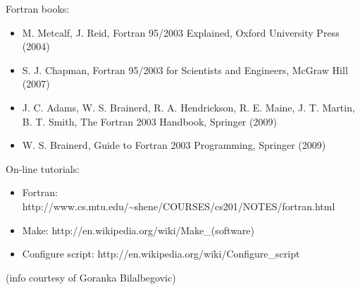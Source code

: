 \documentclass[12pt,a4paper]{article}
\begin{document}
Fortran books:
\begin{itemize}
\item
M. Metcalf, J. Reid, Fortran 95/2003 Explained, Oxford University Press (2004)
\item
S. J. Chapman, Fortran 95/2003 for Scientists and Engineers, McGraw Hill (2007)
\item
J. C. Adams, W. S. Brainerd, R. A. Hendrickson, R. E. Maine, J. T. Martin,
B. T. Smith, The Fortran 2003 Handbook, Springer (2009)
\item
W. S. Brainerd, Guide to Fortran 2003 Programming, Springer (2009)
\end{itemize}
On-line tutorials:
\begin{itemize}
\item Fortran:
http://www.cs.mtu.edu/\~{}shene/COURSES/cs201/NOTES/fortran.html
\item Make:
http://en.wikipedia.org/wiki/Make\_(software)
\item Configure script:
http://en.wikipedia.org/wiki/Configure\_script
\end{itemize}
(info courtesy of Goranka Bilalbegovic)
\end{document}
